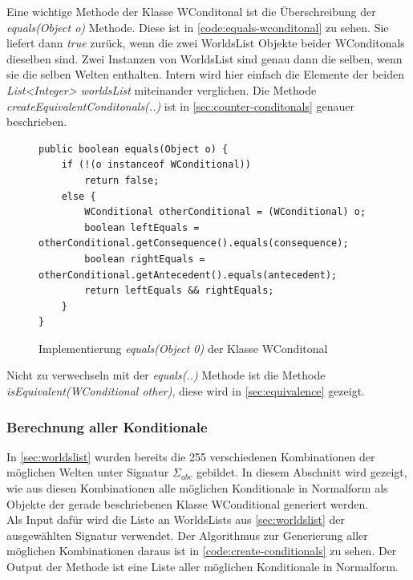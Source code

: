 \documentclass[12pt,a4paper]{article}
\begin{document}
Eine wichtige Methode der Klasse WConditonal ist die Überschreibung der \textit{equals(Object o)} Methode. Diese ist in \autoref{code:equals-wconditonal} zu sehen. Sie liefert dann \textit{true} zurück, wenn die zwei WorldsList Objekte beider WConditonals dieselben sind. Zwei Instanzen von WorldsList sind genau dann die selben, wenn sie die selben Welten enthalten. Intern wird hier einfach die Elemente der beiden \textit{List<Integer> worldsList} miteinander verglichen. Die Methode \textit{createEquivalentConditonals(..)} ist in \autoref{sec:counter-conditonals} genauer beschrieben. 


\begin{figure}
\begin{lstlisting}
public boolean equals(Object o) {
    if (!(o instanceof WConditional))
        return false;
    else {
        WConditional otherConditional = (WConditional) o;
        boolean leftEquals = otherConditional.getConsequence().equals(consequence);
        boolean rightEquals = otherConditional.getAntecedent().equals(antecedent);
        return leftEquals && rightEquals;
    }
}
\end{lstlisting}
\caption{Implementierung \textit{equals(Object 0)} der Klasse WConditonal}
\label{code:equals-wconditonal}
\end{figure}


Nicht zu verwechseln mit der \textit{equals(..)} Methode ist die Methode \textit{isEquivalent(WConditional other)}, diese wird in \autoref{sec:equivalence} gezeigt.



\subsubsection{Berechnung aller Konditionale}




In \autoref{sec:worldslist} wurden bereits die 255 verschiedenen Kombinationen der möglichen Welten unter Signatur $\Sigma_{abc}$ gebildet. In diesem Abschnitt wird gezeigt, wie aus diesen Kombinationen alle möglichen Konditionale in Normalform als Objekte der gerade beschriebenen Klasse WConditional generiert werden. \\
Als Input dafür wird die Liste an WorldsLists aus \autoref{sec:worldslist} der ausgewählten Signatur verwendet. Der Algorithmus zur Generierung aller möglichen Kombinationen daraus ist in \autoref{code:create-conditionals} zu sehen. Der Output der Methode ist eine Liste aller möglichen Konditionale in Normalform. 
\end{document}
